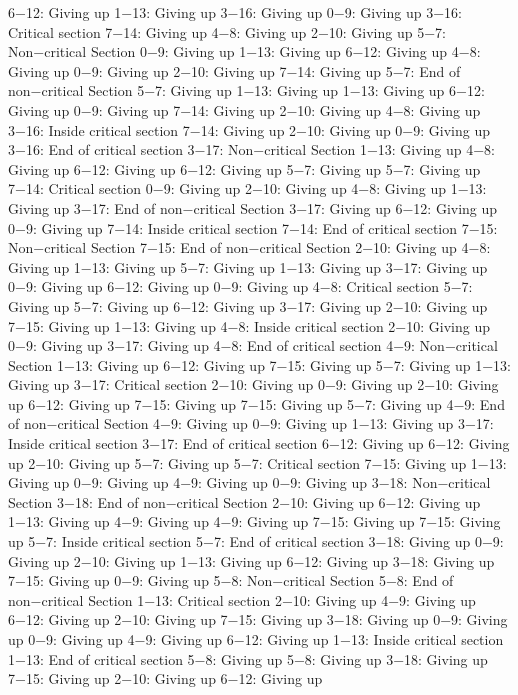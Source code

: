 6−12: Giving up
1−13: Giving up
3−16: Giving up
0−9: Giving up
3−16: Critical section
7−14: Giving up
4−8: Giving up
2−10: Giving up
5−7: Non−critical Section
0−9: Giving up
1−13: Giving up
6−12: Giving up
4−8: Giving up
0−9: Giving up
2−10: Giving up
7−14: Giving up
5−7: End of non−critical Section
5−7: Giving up
1−13: Giving up
1−13: Giving up
6−12: Giving up
0−9: Giving up
7−14: Giving up
2−10: Giving up
4−8: Giving up
3−16: Inside critical section
7−14: Giving up
2−10: Giving up
0−9: Giving up
3−16: End of critical section
3−17: Non−critical Section
1−13: Giving up
4−8: Giving up
6−12: Giving up
6−12: Giving up
5−7: Giving up
5−7: Giving up
7−14: Critical section
0−9: Giving up
2−10: Giving up
4−8: Giving up
1−13: Giving up
3−17: End of non−critical Section
3−17: Giving up
6−12: Giving up
0−9: Giving up
7−14: Inside critical section
7−14: End of critical section
7−15: Non−critical Section
7−15: End of non−critical Section
2−10: Giving up
4−8: Giving up
1−13: Giving up
5−7: Giving up
1−13: Giving up
3−17: Giving up
0−9: Giving up
6−12: Giving up
0−9: Giving up
4−8: Critical section
5−7: Giving up
5−7: Giving up
6−12: Giving up
3−17: Giving up
2−10: Giving up
7−15: Giving up
1−13: Giving up
4−8: Inside critical section
2−10: Giving up
0−9: Giving up
3−17: Giving up
4−8: End of critical section
4−9: Non−critical Section
1−13: Giving up
6−12: Giving up
7−15: Giving up
5−7: Giving up
1−13: Giving up
3−17: Critical section
2−10: Giving up
0−9: Giving up
2−10: Giving up
6−12: Giving up
7−15: Giving up
7−15: Giving up
5−7: Giving up
4−9: End of non−critical Section
4−9: Giving up
0−9: Giving up
1−13: Giving up
3−17: Inside critical section
3−17: End of critical section
6−12: Giving up
6−12: Giving up
2−10: Giving up
5−7: Giving up
5−7: Critical section
7−15: Giving up
1−13: Giving up
0−9: Giving up
4−9: Giving up
0−9: Giving up
3−18: Non−critical Section
3−18: End of non−critical Section
2−10: Giving up
6−12: Giving up
1−13: Giving up
4−9: Giving up
4−9: Giving up
7−15: Giving up
7−15: Giving up
5−7: Inside critical section
5−7: End of critical section
3−18: Giving up
0−9: Giving up
2−10: Giving up
1−13: Giving up
6−12: Giving up
3−18: Giving up
7−15: Giving up
0−9: Giving up
5−8: Non−critical Section
5−8: End of non−critical Section
1−13: Critical section
2−10: Giving up
4−9: Giving up
6−12: Giving up
2−10: Giving up
7−15: Giving up
3−18: Giving up
0−9: Giving up
0−9: Giving up
4−9: Giving up
6−12: Giving up
1−13: Inside critical section
1−13: End of critical section
5−8: Giving up
5−8: Giving up
3−18: Giving up
7−15: Giving up
2−10: Giving up
6−12: Giving up
